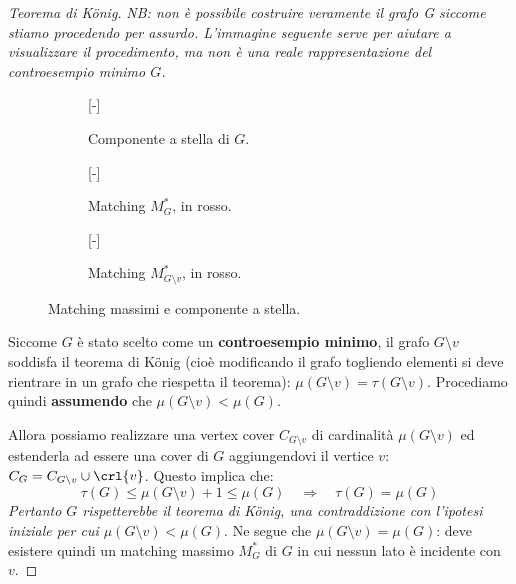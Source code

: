 \documentclass[\main/main.tex]{subfiles}
\begin{document}
\begin{proof}[Teorema di König]
	\textit{NB: non è possibile costruire veramente il grafo G siccome stiamo procedendo per assurdo. L'immagine seguente serve per aiutare a visualizzare il procedimento, ma non è una reale rappresentazione del controesempio minimo \(G\).}

	\begin{figure}
		\begin{subfigure}{0.33\textwidth}
			[-]
			\MinimalGraph{}
			\caption{Componente a stella di \(G\).}
		\end{subfigure}
		\begin{subfigure}{0.33\textwidth}
			[-]
			\MinimalGraph{}
			\caption{Matching \(M^*_G\), in rosso.}
		\end{subfigure}
		\begin{subfigure}{0.33\textwidth}
			[-]
			\MinimalGraph{}
			\caption{Matching \(M^*_{G\setminus v}\), in rosso.}
		\end{subfigure}
		\caption{Matching massimi e componente a stella.}
	\end{figure}
	Siccome \(G\) è stato scelto come un \textbf{controesempio minimo}, il grafo \(G\setminus v\) soddisfa il teorema di König (cioè modificando il grafo togliendo elementi si deve rientrare in un grafo che riespetta il teorema): \(\mu(G\setminus v) = \tau(G\setminus v)\). Procediamo quindi \textbf{assumendo} che \(\mu(G\setminus v)<\mu(G)\).

	Allora possiamo realizzare una vertex cover \(C_{G\setminus v}\) di cardinalità \(\mu(G\setminus v)\) ed estenderla ad essere una cover di \(G\) aggiungendovi il vertice \(v\): \(C_{G} = C_{G\setminus v} \cup \crl{v}\). Questo implica che:
	\[
		\tau(G) \leq \mu(G\setminus v) + 1 \leq \mu(G) \quad \Rightarrow \quad  \tau(G) = \mu(G)
	\]
	\textit{Pertanto \(G\) rispetterebbe il teorema di König, una contraddizione con l'ipotesi iniziale per cui \(\mu(G\setminus v)<\mu(G)\)}. Ne segue che \(\mu(G\setminus v) = \mu(G)\): deve esistere quindi un matching massimo \(M^*_G\) di \(G\) in cui nessun lato è incidente con \(v\).


\end{proof}
\end{document}
